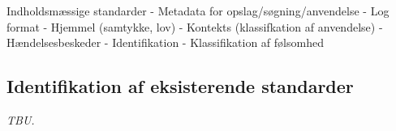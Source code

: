 Indholdsmæssige standarder - Metadata for opslag/søgning/anvendelse -
Log format - Hjemmel (samtykke, lov) - Kontekts (klassifkation af
anvendelse) - Hændelsesbeskeder - Identifikation - Klassifikation af
følsomhed

\subsection{Identifikation af eksisterende
standarder}\label{identifikation-af-eksisterende-standarder}

\emph{TBU.}
